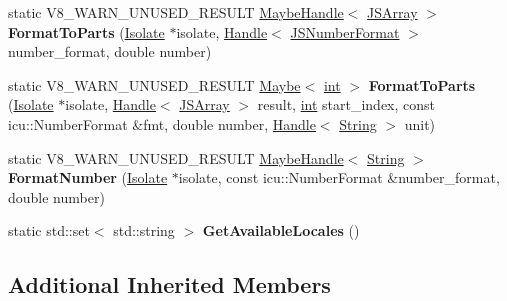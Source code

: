 \begin{DoxyCompactItemize}
\mbox{\label{classv8_1_1internal_1_1JSNumberFormat_ae267697f8132156e42def00ba5ef546e}} 
static V8\+\_\+\+W\+A\+R\+N\+\_\+\+U\+N\+U\+S\+E\+D\+\_\+\+R\+E\+S\+U\+LT \mbox{\hyperlink{classv8_1_1internal_1_1MaybeHandle}{Maybe\+Handle}}$<$ \mbox{\hyperlink{classv8_1_1internal_1_1JSArray}{J\+S\+Array}} $>$ {\bfseries Format\+To\+Parts} (\mbox{\hyperlink{classv8_1_1internal_1_1Isolate}{Isolate}} $\ast$isolate, \mbox{\hyperlink{classv8_1_1internal_1_1Handle}{Handle}}$<$ \mbox{\hyperlink{classv8_1_1internal_1_1JSNumberFormat}{J\+S\+Number\+Format}} $>$ number\+\_\+format, double number)
\item 
\mbox{\label{classv8_1_1internal_1_1JSNumberFormat_af8d8f6e408c0589ad4489e36d76d1634}} 
static V8\+\_\+\+W\+A\+R\+N\+\_\+\+U\+N\+U\+S\+E\+D\+\_\+\+R\+E\+S\+U\+LT \mbox{\hyperlink{classv8_1_1Maybe}{Maybe}}$<$ \mbox{\hyperlink{classint}{int}} $>$ {\bfseries Format\+To\+Parts} (\mbox{\hyperlink{classv8_1_1internal_1_1Isolate}{Isolate}} $\ast$isolate, \mbox{\hyperlink{classv8_1_1internal_1_1Handle}{Handle}}$<$ \mbox{\hyperlink{classv8_1_1internal_1_1JSArray}{J\+S\+Array}} $>$ result, \mbox{\hyperlink{classint}{int}} start\+\_\+index, const icu\+::\+Number\+Format \&fmt, double number, \mbox{\hyperlink{classv8_1_1internal_1_1Handle}{Handle}}$<$ \mbox{\hyperlink{classv8_1_1internal_1_1String}{String}} $>$ unit)
\item 
\mbox{\label{classv8_1_1internal_1_1JSNumberFormat_adf51f64c35e78f6a52cb32f85fcefb6c}} 
static V8\+\_\+\+W\+A\+R\+N\+\_\+\+U\+N\+U\+S\+E\+D\+\_\+\+R\+E\+S\+U\+LT \mbox{\hyperlink{classv8_1_1internal_1_1MaybeHandle}{Maybe\+Handle}}$<$ \mbox{\hyperlink{classv8_1_1internal_1_1String}{String}} $>$ {\bfseries Format\+Number} (\mbox{\hyperlink{classv8_1_1internal_1_1Isolate}{Isolate}} $\ast$isolate, const icu\+::\+Number\+Format \&number\+\_\+format, double number)
\item 
\mbox{\label{classv8_1_1internal_1_1JSNumberFormat_a5c508ba34accfff91e26824992a4078b}} 
static std\+::set$<$ std\+::string $>$ {\bfseries Get\+Available\+Locales} ()
\end{DoxyCompactItemize}
\subsection*{Additional Inherited Members}


